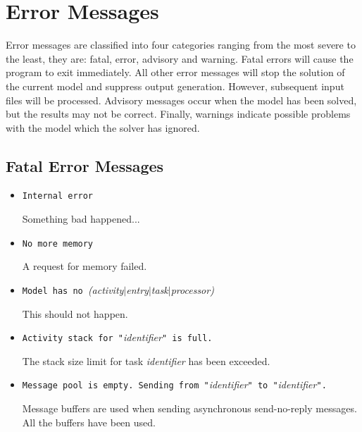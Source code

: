 
\chapter{Error Messages}
\label{sec:error-messages}

Error messages are classified into four categories ranging from the
most severe to the least, they are: fatal, error, advisory and
warning.  Fatal errors will cause the program to exit immediately.
All other error messages will stop the solution of the current model
and suppress output generation.  However, subsequent input files will
be processed.  Advisory messages occur when the model has been solved,
but the results may not be correct.  Finally, warnings indicate
possible problems with the model which the solver has ignored.

\section{Fatal Error Messages}
\label{sec:fatal-error-messages}
\begin{itemize}
\item \texttt{Internal error}

  Something bad happened...


\item \texttt{No more memory}

  A request for memory failed.  


\item \texttt{Model has no }\emph{(activity$|$entry$|$task$|$processor)}

  This should not happen.
  
\item \texttt{Activity stack for "}\emph{identifier}\texttt{" is
    full.}
  
  The stack size limit for task
  \emph{identifier} has been exceeded.

\item \texttt{Message pool is empty.  Sending from
    "}\emph{identifier}\texttt{" to "}\emph{identifier}\texttt{".}
  
  Message buffers are used when sending asynchronous send-no-reply
  messages.  All the buffers have been
  used.
\end{itemize}

